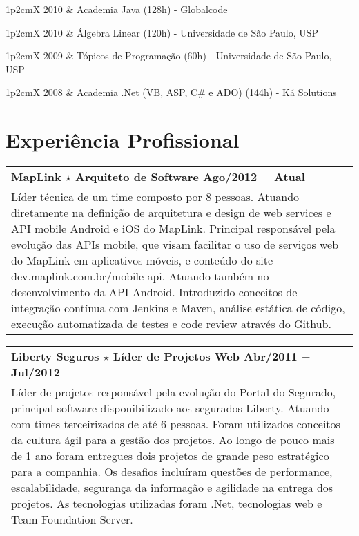 \documentclass[a4paper, oneside, final]{scrartcl}
\newcommand{\vspc}{\vspace{0.15cm}} %
\newcommand{\vspcitem}{\vspace{0.1cm}} %
\begin{document}
\begin{center}
\begin{tabularx}{1\linewidth}{p{2cm}X}
2010       & Academia Java (128h) - Globalcode \vspcitem\\
\end{tabularx}

\begin{tabularx}{1\linewidth}{p{2cm}X}
2010       & Álgebra Linear (120h) - Universidade de São Paulo, USP \vspcitem\\
\end{tabularx}

\begin{tabularx}{1\linewidth}{p{2cm}X}
2009       & Tópicos de Programação (60h) - Universidade de São Paulo, USP \vspcitem\\
\end{tabularx}

\begin{tabularx}{1\linewidth}{p{2cm}X}
2008       & Academia .Net (VB, ASP, C\# e ADO) (144h) - Ká Solutions 
\end{tabularx}

\section{Experiência Profissional}
\begin{tabularx}{1\linewidth}{X}
{\bf MapLink $\star$ Arquiteto de Software \hfill Ago/2012 $-$ Atual} \\
Líder técnica de um time composto por 8 pessoas. Atuando diretamente na definição de arquitetura e design de web services e API mobile Android e iOS do MapLink. Principal responsável pela evolução das APIs mobile, que visam facilitar o uso de serviços web do MapLink em aplicativos móveis, e conteúdo do site dev.maplink.com.br/mobile-api. Atuando também no desenvolvimento da API Android. Introduzido conceitos de integração contínua com Jenkins e Maven, análise estática de código, execução automatizada de testes e code review através do Github. \vspc\\
\end{tabularx}

\begin{tabularx}{1\linewidth}{X}
{\bf Liberty Seguros $\star$ Líder de Projetos Web \hfill Abr/2011 $-$ Jul/2012} \\
Líder de projetos responsável pela evolução do Portal do Segurado, principal software disponibilizado aos segurados Liberty. Atuando com times terceirizados de até 6 pessoas. Foram utilizados conceitos da cultura ágil para a gestão dos projetos. Ao longo de pouco mais de 1 ano foram entregues dois projetos de grande peso estratégico para a companhia. Os desafios incluíram questões de performance, escalabilidade, segurança da informação e agilidade na entrega dos projetos. As tecnologias utilizadas foram .Net, tecnologias web e Team Foundation Server.\vspc\\
\end{tabularx}


\end{center}
\end{document}
